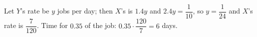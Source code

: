 Let $Y$'s rate be $y$ jobs per day; then $X$'s is $1.4y$ and $2.4y=\dfrac1{10}$, so $y=\dfrac1{24}$ and $X$'s rate is $\dfrac7{120}$. Time for $0.35$ of the job: $0.35\cdot\dfrac{120}7=\boxed{6}$ days.
